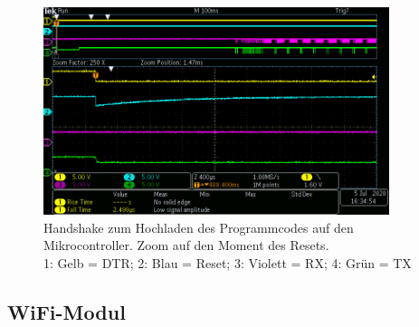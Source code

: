 \begin{figure}[H]
\center
\includegraphics[width =  0.9\textwidth]{graphics/ATMega2560_DTR_RESET_RX_TX_1}
\caption{Handshake zum Hochladen des Programmcodes auf den Mikrocontroller. Zoom auf den Moment des Resets.\\\hspace{\textwidth}1: Gelb = DTR; 2: Blau = Reset; 3: Violett = RX; 4: Grün = TX}
\label{fig:ATMega2560_DTR_RESET_RX_TX_1}
\end{figure}


\subsection{WiFi-Modul}\label{Appendix:Handshake_ESP}

